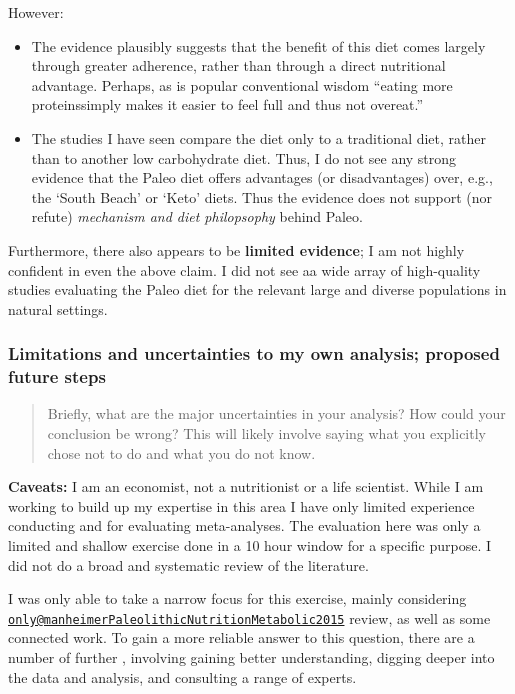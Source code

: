 \documentclass[]{tufte-handout}
\begin{document}
However:

\begin{itemize}
\item
  The evidence plausibly suggests that the benefit of this diet comes
  largely through greater adherence, rather than through a direct
  nutritional advantage. Perhaps, as is popular conventional wisdom
  ``eating more proteinssimply makes it easier to feel full and thus not
  overeat.''
\item
  The studies I have seen compare the diet only to a traditional diet,
  rather than to another low carbohydrate diet. Thus, I do not see any
  strong evidence that the Paleo diet offers advantages (or
  disadvantages) over, e.g., the `South Beach' or `Keto' diets. Thus the
  evidence does not support (nor refute) \emph{mechanism and diet
  philopsophy} behind Paleo.\\
\end{itemize}

Furthermore, there also appears to be \textbf{limited evidence}; I am
not highly confident in even the above claim. I did not see aa wide
array of high-quality studies evaluating the Paleo diet for the relevant
large and diverse populations in natural settings.

\hypertarget{limitations-p}{%
\subsubsection{Limitations and uncertainties to my own analysis;
proposed future steps}\label{limitations-p}}

\begin{quote}
Briefly, what are the major uncertainties in your analysis? How could
your conclusion be wrong? This will likely involve saying what you
explicitly chose not to do and what you do not know.
\end{quote}

\textbf{Caveats:} I am an economist, not a nutritionist or a life
scientist. While I am working to build up my expertise in this area I
have only limited experience conducting and for evaluating
meta-analyses. The evaluation here was only a limited and shallow
exercise done in a 10 hour window for a specific purpose. I did not do a
broad and systematic review of the literature.

I was only able to take a narrow focus for this exercise, mainly
considering
\href{mailto:only@manheimerPaleolithicNutritionMetabolic2015}{\nolinkurl{only@manheimerPaleolithicNutritionMetabolic2015}}
review, as well as some connected work. To gain a more reliable answer
to this question, there are a number of further , involving gaining
better understanding, digging deeper into the data and analysis, and
consulting a range of experts.
\end{document}

